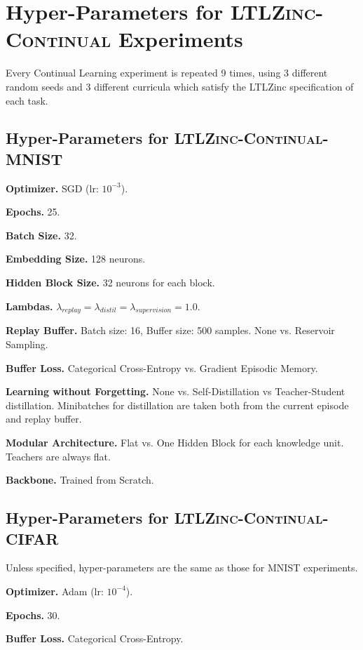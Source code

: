 \chapter{Hyper-Parameters for \textsc{LTLZinc-Continual} Experiments}\label{app:ltlzinccont}
Every Continual Learning experiment is repeated 9 times, using 3 different random seeds and 3 different curricula which satisfy the LTLZinc specification of each task.

\section{Hyper-Parameters for \textsc{LTLZinc-Continual-MNIST}}

\noindent\textbf{Optimizer.} SGD (lr: $10^{-3}$).

\noindent\textbf{Epochs.} 25.

\noindent\textbf{Batch Size.} 32.

\noindent\textbf{Embedding Size.} 128 neurons.

\noindent\textbf{Hidden Block Size.} 32 neurons for each block.

\noindent\textbf{Lambdas.} $\lambda_{replay} = \lambda_{distil} = \lambda_{supervision} = 1.0$.

\noindent\textbf{Replay Buffer.} Batch size: 16, Buffer size: 500 samples. None vs. Reservoir Sampling.

\noindent\textbf{Buffer Loss.} Categorical Cross-Entropy vs. Gradient Episodic Memory.

\noindent\textbf{Learning without Forgetting.} None vs. Self-Distillation vs Teacher-Student distillation. Minibatches for distillation are taken both from the current episode and replay buffer.

\noindent\textbf{Modular Architecture.} Flat vs. One Hidden Block for each knowledge unit. Teachers are always flat. 

\noindent\textbf{Backbone.} Trained from Scratch.

\section{Hyper-Parameters for \textsc{LTLZinc-Continual-CIFAR}}
Unless specified, hyper-parameters are the same as those for MNIST experiments.

\noindent\textbf{Optimizer.} Adam (lr: $10^{-4}$).

\noindent\textbf{Epochs.} 30.

\noindent\textbf{Buffer Loss.} Categorical Cross-Entropy.

